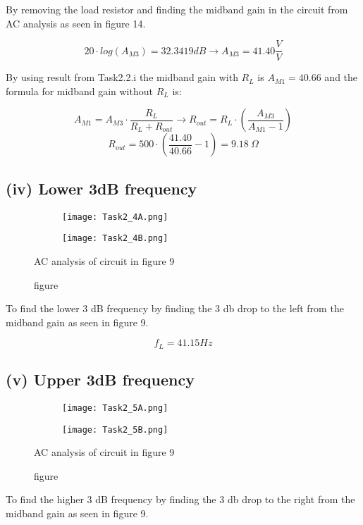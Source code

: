 	By removing the load resistor and finding the midband gain in the circuit from AC analysis as seen in figure 14.

	$$ 20 \cdot log(A_{M3}) = 32.3419 dB  \rightarrow A_{M3} = 41.40 \frac{V}{V}$$


	By using result from Task2.2.i the midband gain with $R_{L}$ is $A_{M1} = 40.66$ and the formula for midband gain without $R_{L}$ is:

	$$A_{M1} = A_{M3} \cdot \frac{R_{L}}{R_{L} + R_{out}} \rightarrow R_{out} = R_{L} \cdot (\frac{A_{M3}}{A_{M1} - 1})  $$
	$$R_{out} = 500 \cdot (\frac{41.40}{40.66}-1) = 9.18\ \Omega$$ 

	\pagebreak


	\subsection*{(iv) Lower 3dB frequency}

	\begin{figure}[h!]
	    \centering
	    \begin{subfigure}[h]{0.7\textwidth}
	            \texttt{[image: Task2\_4A.png]}
	            \label{fig:}
	    \end{subfigure}
	    \begin{subfigure}[h]{0.25\textwidth}
	            \texttt{[image: Task2\_4B.png]}
	            \label{fig:}
	    \end{subfigure}
	    \caption{figure}{AC analysis of circuit in figure 9}
	\end{figure}

	To find the lower 3 dB frequency by finding the 3 db drop to the left from the midband gain as seen in figure 9.

	$$f_{L} =  41.15 Hz$$




	
	\subsection*{(v) Upper 3dB frequency}

	\begin{figure}[h!]
	    \centering
	    \begin{subfigure}[h]{0.7\textwidth}
	            \texttt{[image: Task2\_5A.png]}
	            \label{fig:}
	    \end{subfigure}
	    \begin{subfigure}[h]{0.25\textwidth}
	            \texttt{[image: Task2\_5B.png]}
	            \label{fig:}
	    \end{subfigure}
	    \caption{figure}{AC analysis of circuit in figure 9}
	\end{figure}
	To find the higher 3 dB frequency by finding the 3 db drop to the right from the midband gain as seen in figure 9.

